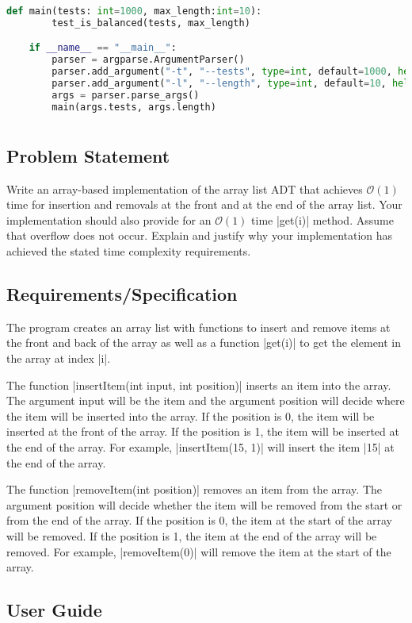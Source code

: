 \documentclass{report}
\begin{document}
\begin{lstlisting}[language=Python]
	def main(tests: int=1000, max_length:int=10):
		test_is_balanced(tests, max_length)

	if __name__ == "__main__":
		parser = argparse.ArgumentParser()
		parser.add_argument("-t", "--tests", type=int, default=1000, help="number of tests to run")
		parser.add_argument("-l", "--length", type=int, default=10, help="maximum length of the statement")
		args = parser.parse_args()
		main(args.tests, args.length)
\end{lstlisting}
\chapter{}
\section{Problem Statement}
Write an array-based implementation of the array list ADT that achieves \(\mathcal{O}(1)\) time for insertion and removals at the front and at the end of the array list. Your implementation should also provide for an \(\mathcal{O}(1)\) time |get(i)| method. Assume that overflow does not occur. Explain and justify why your implementation has achieved the stated time complexity requirements.
\section{Requirements/Specification}
The program creates an array list with functions to insert and remove items at the front and back of the array as well as a function |get(i)| to get the element in the array at index |i|.

The function |insertItem(int input, int position)| inserts an item into the array. The argument input will be the item and the argument position will decide where the item will be inserted into the array. If the position is 0, the item will be inserted at the front of the array. If the position is 1, the item will be inserted at the end of the array. For example, |insertItem(15, 1)| will insert the item |15| at the end of the array.

The function |removeItem(int position)| removes an item from the array. The argument position will decide whether the item will be removed from the start or from the end of the array. If the position is 0, the item at the start of the array will be removed. If the position is 1, the item at the end of the array will be removed. For example, |removeItem(0)| will remove the item at the start of the array.
\section{User Guide}
\end{document}
